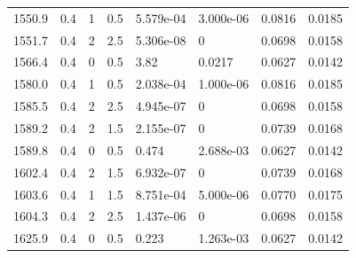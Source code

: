 \documentclass[preview]{standalone}
\begin{document}
{{{\begin{tabular}{L{1.2cm}C{1.2cm} C{0.3cm}C{0.5cm} C{1.4cm}C{1.4cm} C{1.4cm}C{1.4cm}}
  1550.9  &   0.4  & 1     & 0.5 &  5.579e-04  & 3.000e-06  & 0.0816 &  0.0185   \\ 
  1551.7  &   0.4  & 2     & 2.5 &  5.306e-08  & 0  & 0.0698 &  0.0158   \\ 
  1566.4  &   0.4  & 0     & 0.5 &  3.82  & 0.0217  & 0.0627 &  0.0142   \\ 
  1580.0  &   0.4  & 1     & 0.5 &  2.038e-04  & 1.000e-06  & 0.0816 &  0.0185   \\ 
  1585.5  &   0.4  & 2     & 2.5 &  4.945e-07  & 0  & 0.0698 &  0.0158   \\ 
  1589.2  &   0.4  & 2     & 1.5 &  2.155e-07  & 0  & 0.0739 &  0.0168   \\ 
  1589.8  &   0.4  & 0     & 0.5 &  0.474  & 2.688e-03  & 0.0627 &  0.0142   \\ 
  1602.4  &   0.4  & 2     & 1.5 &  6.932e-07  & 0  & 0.0739 &  0.0168   \\ 
  1603.6  &   0.4  & 1     & 1.5 &  8.751e-04  & 5.000e-06  & 0.0770 &  0.0175   \\ 
  1604.3  &   0.4  & 2     & 2.5 &  1.437e-06  & 0  & 0.0698 &  0.0158   \\ 
  1625.9  &   0.4  & 0     & 0.5 &  0.223  & 1.263e-03  & 0.0627 &  0.0142   \\ 
\hline 
\end{tabular} 

}}}
\end{document}
